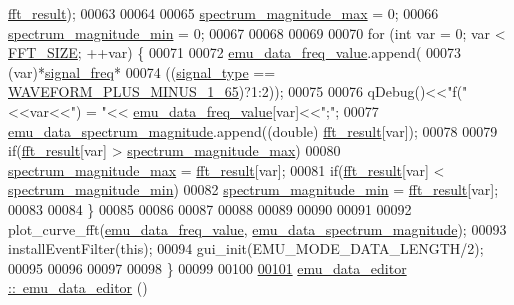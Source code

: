 \begin{DoxyCode}
      \hyperlink{a00008_a63b6150bfbba86ba943877a2f547ddd8}{fft\_result});
00063 
00064 
00065     \hyperlink{a00008_ae0119c7dd2179cdcb3ea37adbefdc289}{spectrum\_magnitude\_max} = 0;
00066     \hyperlink{a00008_afb692cc49c350d4bf120ca1e3dd61e93}{spectrum\_magnitude\_min} = 0;
00067 
00068 
00069 
00070     \textcolor{keywordflow}{for} (\textcolor{keywordtype}{int} var = 0; var < \hyperlink{a00094_a636ddc19af00bc87969a07c88331f105}{FFT\_SIZE}; ++var) \{
00071 
00072         \hyperlink{a00008_a62129d59e218ab857cd50cb202205129}{emu\_data\_freq\_value}.append(
00073                     (var)*\hyperlink{a00008_a67039999d520fc483fab521fae5ddde4}{signal\_freq}*
00074                     ((\hyperlink{a00008_a070edaec5aee6ba1f5a6866bc32c8ce4}{signal\_type} == \hyperlink{a00090_a0923d3b365a36e1e8c401cec964aa36f}{WAVEFORM\_PLUS\_MINUS\_1\_65})?1:2));
00075 
00076         qDebug()<<\textcolor{stringliteral}{"f("}<<var<<\textcolor{stringliteral}{") = "}<< \hyperlink{a00008_a62129d59e218ab857cd50cb202205129}{emu\_data\_freq\_value}[var]<<\textcolor{stringliteral}{";"};
00077         \hyperlink{a00008_ac3c515466f79ab8e60a58e8d15a3b991}{emu\_data\_spectrum\_magnitude}.append((\textcolor{keywordtype}{double})
      \hyperlink{a00008_a63b6150bfbba86ba943877a2f547ddd8}{fft\_result}[var]);
00078 
00079         \textcolor{keywordflow}{if}(\hyperlink{a00008_a63b6150bfbba86ba943877a2f547ddd8}{fft\_result}[var] > \hyperlink{a00008_ae0119c7dd2179cdcb3ea37adbefdc289}{spectrum\_magnitude\_max})
00080             \hyperlink{a00008_ae0119c7dd2179cdcb3ea37adbefdc289}{spectrum\_magnitude\_max} = \hyperlink{a00008_a63b6150bfbba86ba943877a2f547ddd8}{fft\_result}[var];
00081         \textcolor{keywordflow}{if}(\hyperlink{a00008_a63b6150bfbba86ba943877a2f547ddd8}{fft\_result}[var] < \hyperlink{a00008_afb692cc49c350d4bf120ca1e3dd61e93}{spectrum\_magnitude\_min})
00082             \hyperlink{a00008_afb692cc49c350d4bf120ca1e3dd61e93}{spectrum\_magnitude\_min} = \hyperlink{a00008_a63b6150bfbba86ba943877a2f547ddd8}{fft\_result}[var];
00083 
00084     \}
00085 
00086 
00087 
00088 
00089 
00090 
00091 
00092     plot\_curve\_fft(\hyperlink{a00008_a62129d59e218ab857cd50cb202205129}{emu\_data\_freq\_value},
      \hyperlink{a00008_ac3c515466f79ab8e60a58e8d15a3b991}{emu\_data\_spectrum\_magnitude});
00093     installEventFilter(\textcolor{keyword}{this});
00094     gui\_init(EMU\_MODE\_DATA\_LENGTH/2);
00095 
00096 
00097 
00098 \}
00099 
00100 
\hypertarget{a00093_source_l00101}{}\hyperlink{a00008_ab897c9d3081a980c0ad94f09d5dbce99}{00101} \hyperlink{a00008_ab897c9d3081a980c0ad94f09d5dbce99}{emu\_data\_editor ::~emu\_data\_editor} ()

\end{DoxyCode}
